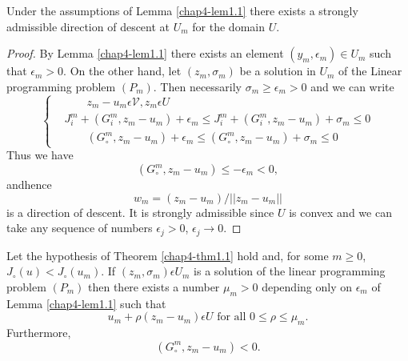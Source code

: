 \begin{corollary}\label{chap4-coro1.1}
Under the assumptions of Lemma \ref{chap4-lem1.1} there exists a strongly admissible direction of descent at $U_{m}$ for the domain $U$.
\end{corollary}

\begin{proof}
By Lemma \ref{chap4-lem1.1} there exists an element $(y_{m}, \epsilon_{m}) \in U_{m}$ such that $\epsilon_{m} > 0$. On the other hand, let $(z_{m}, \sigma_{m})$ be a solution in $U_{m}$ of the Linear programming problem $(P_{m})$. Then necessarily $\sigma_{m} \geq \epsilon_{m} > 0$ and we can write
\begin{equation*}
\begin{cases}
& \qquad z_{m} - u_{m} \epsilon \mathscr{V}, z_{m} \epsilon U\\
& J_{i}^{m} + (G_{i}^{m}, z_{m} - u_{m}) + \epsilon_{m} \leq J_{i}^{m} + (G_{i}^{m}, z_{m} - u_{m}) + \sigma_{m} \leq 0\\
& \qquad (G_{\circ}^{m}, z_{m}-u_{m}) + \epsilon_{m} \leq (G_{\circ}^{m}, z_{m}-u_{m}) + \sigma_{m} \leq 0\tag{1.7}\label{chap4-eq1.7}
\end{cases}
\end{equation*}
Thus we have
\begin{equation*}
(G_{\circ}^{m}, z_{m}-u_{m}) \leq - \epsilon_{m} < 0,\tag{1.8}\label{chap4-eq1.8}
\end{equation*}
and\pageoriginale hence
\begin{equation*}
w_{m} = (z_{m}-u_{m}) / ||z_{m}-u_{m}||\tag{1.9}\label{chap4-eq1.9}
\end{equation*}
is a direction of descent. It is  strongly admissible since $U$ is convex and we can take any sequence of numbers $\epsilon_{j} > 0$, $\epsilon_{j} \to 0$.
\end{proof}

\begin{lemma}\label{chap4-lem1.2}
Let the hypothesis of Theorem \ref{chap4-thm1.1} hold and, for some $m \geq 0$, $J_{\circ}(u) < J_{\circ}(u_{m})$. If $(z_{m}, \sigma_{m}) \epsilon U_{m}$ is a solution of the linear programming problem $(P_{m})$ then there exists a number $\mu_{m} > 0$ depending only on $\epsilon_{m}$ of Lemma \ref{chap4-lem1.1} such that
\begin{equation*}
u_{m} + \rho(z_{m}-u_{m}) \epsilon U \text{ for all } 0 \leq \rho \leq \mu_{m}.\tag{1.10}\label{chap4-eq1.10}
\end{equation*}
Furthermore,
$$
(G_{\circ}^{m}, z_{m}-u_{m}) < 0. 
$$
\end{lemma}

